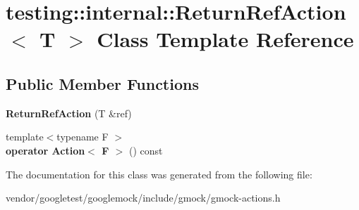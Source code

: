\hypertarget{classtesting_1_1internal_1_1_return_ref_action}{}\section{testing\+:\+:internal\+:\+:Return\+Ref\+Action$<$ T $>$ Class Template Reference}
\label{classtesting_1_1internal_1_1_return_ref_action}
\subsection*{Public Member Functions}
\begin{DoxyCompactItemize}
\item 
\mbox{\label{classtesting_1_1internal_1_1_return_ref_action_a1384b1cd78f3069f0493e2302f143701}} 
{\bfseries Return\+Ref\+Action} (T \&ref)
\item 
\mbox{\label{classtesting_1_1internal_1_1_return_ref_action_a48e5d411097707e558af62eb68edc162}} 
{\footnotesize template$<$typename F $>$ }\\{\bfseries operator Action$<$ F $>$} () const
\end{DoxyCompactItemize}


The documentation for this class was generated from the following file\+:\begin{DoxyCompactItemize}
\item 
vendor/googletest/googlemock/include/gmock/gmock-\/actions.\+h\end{DoxyCompactItemize}
